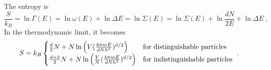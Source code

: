     The entropy is 
    \begin{equation*}
        \frac{S}{k_B} = \ln \Gamma(E) = \ln \omega(E) + \ln \Delta E = \ln \Sigma(E) = \ln \Sigma(E) + \ln \frac{dN}{2E} + \ln \Delta E ~,
    \end{equation*}
    In the thermodynamic limit, it becomes
    \begin{equation*}
        S = k_B \begin{cases}
            \frac{d}{2} N + N \ln \Big ( V (\frac{4 \pi m E}{d N h^2})^{d/2} \Big) & \textnormal{for distinguishable particles} \\
            \frac{d + 2}{2} N + N \ln \Big ( \frac{V}{N} (\frac{4 \pi m E}{d N h^2})^{d/2} \Big) & \textnormal{for indistinguishable particles} \\
        \end{cases} ~.
    \end{equation*}
